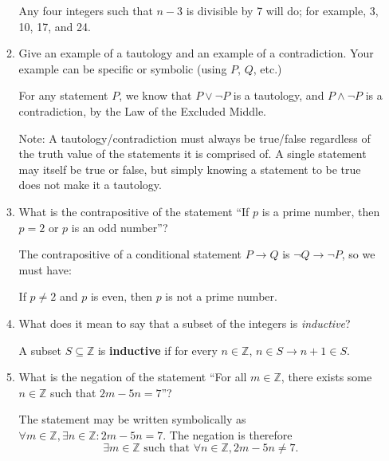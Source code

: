 \documentclass[12pt]{article}
\newcommand{\points}[1]{\marginpar{\hspace{24pt}[#1]}}
\newcommand{\Z}{\mathbb{Z}}
\begin{document}
\begin{enumerate}
\begin{enumerate}
\bigskip

Any four integers such that $n-3$ is divisible by 7 will do; for example, 3, 10, 17, and 24.

\bigskip

\item Give an example of a tautology and an example of a contradiction. Your example can be specific or symbolic (using $P$, $Q$, etc.)\points{2}

\bigskip

For any statement $P$, we know that $P\vee \neg P$ is a tautology, and $P\wedge \neg P$ is a contradiction, by the Law of the Excluded Middle.

\medskip

Note: A tautology/contradiction must always be true/false regardless of the truth value of the statements it is comprised of. A single statement may itself be true or false, but simply knowing a statement to be true does not make it a tautology.

\bigskip

\item What is the contrapositive of the statement ``If $p$ is a prime number, then $p=2$ or $p$ is an odd number''?\points{2}

\bigskip

The contrapositive of a conditional statement $P\to Q$ is $\neg Q\to \neg P$, so we must have:

\medskip

If $p\neq 2$ and $p$ is even, then $p$ is not a prime number.

\bigskip

\item What does it mean to say that a subset of the integers is {\em inductive}? \points{2}

\bigskip

A subset $S\subseteq \mathbb{Z}$ is {\bf inductive} if for every $n\in\mathbb{Z}$, $n\in S \to n+1\in S$.

\bigskip

\item What is the negation of the statement ``For all $m\in\Z$, there exists some $n\in \Z$ such that $2m-5n=7$''? \points{2}

\bigskip

The statement may be written symbolically as $\forall m\in\Z, \exists n\in\Z : 2m-5n=7$. The negation is therefore
\[
 \exists m\in \Z \text{ such that } \forall n\in \Z, 2m-5n\neq 7.
\]




\end{enumerate}
\end{enumerate}
\end{document}
